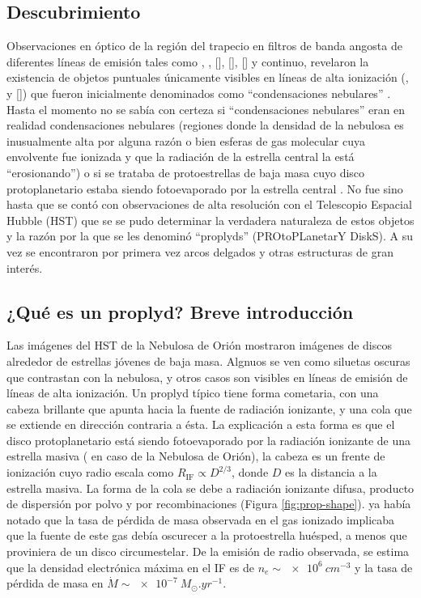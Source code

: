 \subsection{Descubrimiento}
Observaciones en óptico de la región del trapecio en filtros de banda angosta de diferentes líneas de emisión tales como , , [], [], [] y continuo, revelaron la existencia de objetos puntuales únicamente visibles en líneas de alta ionización (,  y []) que fueron inicialmente denominados como ``condensaciones nebulares'' \citep{Laques:1979}. Hasta el momento no se sabía con certeza si ``condensaciones nebulares'' eran en realidad condensaciones nebulares (regiones donde la densidad de la nebulosa es inusualmente alta por alguna razón o bien esferas de gas molecular cuya envolvente fue ionizada y que la radiación de la estrella central la está ``erosionando'') o si se trataba de protoestrellas de baja masa cuyo disco protoplanetario estaba siendo fotoevaporado por la estrella central \citep{churchwell:1987}. No fue sino hasta que se contó con observaciones de alta resolución con el Telescopio Espacial Hubble (HST) que se se pudo determinar la verdadera naturaleza de estos objetos \citep{ODell:1993} y la razón por la que se les denominó ``proplyds'' (PROtoPLanetarY DiskS). A su vez se encontraron por primera vez arcos delgados y otras estructuras de gran interés.

\subsection{¿Qué es un proplyd? Breve introducción \citep{Johnstone:1998}}
\label{sec:prop-Johnstone}

Las imágenes del HST de la Nebulosa de Orión mostraron imágenes de discos alrededor de estrellas jóvenes de baja masa. Algnuos se ven como siluetas oscuras que contrastan con la nebulosa, y otros casos son visibles en líneas de emisión de líneas de alta ionización. Un proplyd típico tiene forma cometaria, con una cabeza brillante que apunta hacia la fuente de radiación ionizante, y una cola que se extiende en dirección contraria a ésta. La explicación a esta forma es que el disco protoplanetario está siendo fotoevaporado por la radiación ionizante de una estrella masiva (\thC{} en caso de la Nebulosa de Orión), la cabeza es un frente de ionización cuyo radio escala como $R_{\mathrm{IF}} \propto D^{2/3}$, donde $D$ es la distancia a la estrella masiva. La forma de la cola se debe a radiación ionizante difusa, producto de dispersión por polvo y por recombinaciones (Figura \ref{fig:prop-shape}). \citet{churchwell:1987} ya había notado que la tasa de pérdida de masa observada
en el gas ionizado implicaba que la fuente de este gas debía oscurecer a la protoestrella huésped, a menos que proviniera de un disco circumestelar. De la
emisión de radio observada, se estima que la densidad electrónica máxima en el IF es de $n_e \sim \SI{e6}{cm^{-3}}$ y la tasa de pérdida de masa en $\dot{M} \sim \SI{e-7}{M_\odot.yr^{-1}}$.

